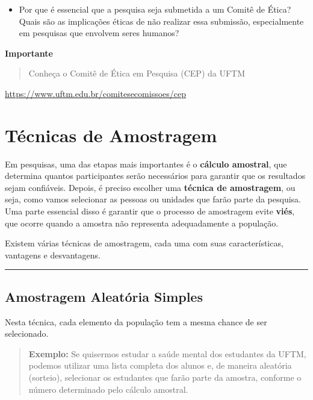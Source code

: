 \documentclass[
]{book}
\providecommand{\tightlist}{%
  \setlength{\itemsep}{0pt}\setlength{\parskip}{0pt}}
\begin{document}
\begin{enumerate}
  \begin{itemize}
  \tightlist
  \item
    Por que é essencial que a pesquisa seja submetida a um Comitê de Ética? Quais são as implicações éticas de não realizar essa submissão, especialmente em pesquisas que envolvem seres humanos?
  \end{itemize}
\end{enumerate}

\textbf{Importante}

\begin{quote}
Conheça o Comitê de Ética em Pesquisa (CEP) da UFTM
\end{quote}

\url{https://www.uftm.edu.br/comitesecomissoes/cep}

\chapter{Técnicas de Amostragem}\label{tuxe9cnicas-de-amostragem}

Em pesquisas, uma das etapas mais importantes é o \textbf{cálculo amostral}, que determina quantos participantes serão necessários para garantir que os resultados sejam confiáveis. Depois, é preciso escolher uma \textbf{técnica de amostragem}, ou seja, como vamos selecionar as pessoas ou unidades que farão parte da pesquisa. Uma parte essencial disso é garantir que o processo de amostragem evite \textbf{viés}, que ocorre quando a amostra não representa adequadamente a população.

Existem várias técnicas de amostragem, cada uma com suas características, vantagens e desvantagens.

\begin{center}\rule{0.5\linewidth}{0.5pt}\end{center}

\section{Amostragem Aleatória Simples}\label{amostragem-aleatuxf3ria-simples}

Nesta técnica, cada elemento da população tem a mesma chance de ser selecionado.

\begin{quote}
\textbf{Exemplo:} Se quisermos estudar a saúde mental dos estudantes da UFTM, podemos utilizar uma lista completa dos alunos e, de maneira aleatória (sorteio), selecionar os estudantes que farão parte da amostra, conforme o número determinado pelo cálculo amostral.
\end{quote}
\end{document}
